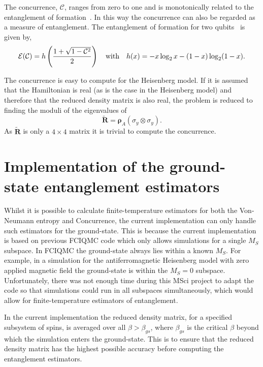 The concurrence, $\mathcal{C}$, ranges from zero to one and is monotonically related to the entanglement of formation~\cite{Hill1997}. In this way the concurrence can also be regarded as a measure of entanglement. The entanglement of formation for two qubits~\cite{Wootters2001} is given by,
\begin{equation}
\mathcal{E}(\mathcal{C}) = h\left( \frac{1+\sqrt{1-\mathcal{C}^2}}{2}\right)
\textnormal{\phantom{---}with\phantom{---}}
h(x) = -x\log_2 x - (1-x)\log_2 (1-x).
\end{equation}

The concurrence is easy to compute for the Heisenberg model. If it is assumed that the Hamiltonian is real (as is the case in the Heisenberg model) and therefore that the reduced density matrix is also real, the problem is reduced to finding the moduli of the eigenvalues of 
\begin{equation}
\label{eq:concurrenceMatrix}
\tilde{\bm{R}} = \bm{\rho}_A(\sigma_y\otimes\sigma_y).
\end{equation}
As $\tilde{\bm{R}}$ is only a $4\times4$ matrix it is trivial to compute the concurrence.
\section{Implementation of the ground-state entanglement estimators}
Whilst it is possible to calculate finite-temperature estimators for both the Von-Neumann entropy and Concurrence, the current implementation can only handle such estimators for the ground-state. This is because   the current implementation is based on previous FCIQMC code which only allows simulations for a single $M_S$ subspace. In FCIQMC the ground-state always lies within a known $M_S$. For example, in a simulation for the antiferromagnetic Heisenberg model with zero applied magnetic field the ground-state is within the $M_S=0$ subspace. Unfortunately, there was not enough time during this MSci project to adapt the code so that simulations could run in all subspaces simultaneously, which would allow for finite-temperature estimators of entanglement.

In the current implementation the reduced density matrix, for a specified subsystem of spins, is averaged over all $\beta>\beta_{gs}$, where $\beta_{gs}$ is the critical $\beta$ beyond which the simulation enters the ground-state. This is to ensure that the reduced density matrix has the highest possible accuracy before computing the entanglement estimators.

